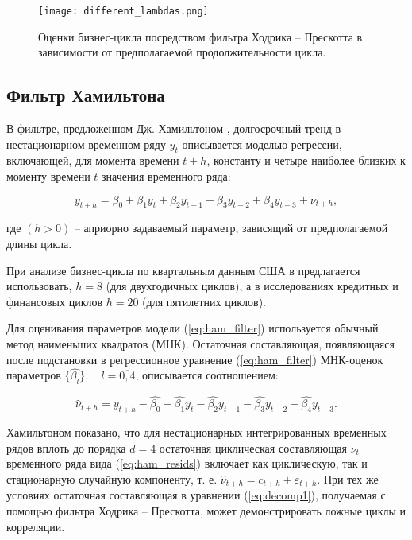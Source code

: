 \documentclass[a4paper,14pt]{extreport}
\begin{document}
	\begin{figure}
		\texttt{[image: different\_lambdas.png]}
		\caption{Оценки бизнес-цикла посредством фильтра Ходрика -- Прескотта в зависимости от предполагаемой продолжительности цикла.}
		\label{fig:different_lambda}
	\end{figure} 	
	
	\subsection{Фильтр Хамильтона}
	
	В фильтре, предложенном Дж. Хамильтоном \cite{hamHP}, долгосрочный тренд в нестационарном временном ряду $y_t$ описывается моделью регрессии, включающей, для момента времени $t+h$, константу и четыре наиболее близких к моменту времени $t$ значения временного ряда: 
	
	\begin{equation}
		y_{t+h} = \beta_0 + \beta_1 y_t + \beta_2 y_{t-1} 
		+ \beta_3 y_{t-2} + \beta_4 y_{t-3} + \nu_{t+h} ,
		\label{eq:ham_filter}
	\end{equation}
	
	где $(h>0)$ -- априорно задаваемый параметр, зависящий от предполагаемой длины цикла. 
	
	При анализе бизнес-цикла по квартальным данным США в \cite{hamHP} предлагается использовать, $h=8$ (для двухгодичных циклов), а в исследованиях кредитных и финансовых циклов $h=20$ (для пятилетних циклов).
	
	Для оценивания параметров модели (\ref{eq:ham_filter}) используется обычный метод наименьших квадратов (МНК). Остаточная составляющая, появляющаяся после подстановки в регрессионное уравнение (\ref{eq:ham_filter}) МНК-оценок параметров $\{\hat{\beta_l}\}, \quad l=\overline{0,4}$, описывается соотношением:
	
	\begin{equation}
		\hat{\nu}_{t+h} = y_{t+h} - \hat{\beta_0} - \hat{\beta_1} y_t 
		- \hat{\beta_2} y_{t-1} - \hat{\beta_3} y_{t-2} - \hat{\beta_4} y_{t-3} .
		\label{eq:ham_resids}
	\end{equation}	
	
	Хамильтоном показано, что для нестационарных интегрированных временных рядов вплоть до порядка $d=4$ остаточная циклическая составляющая $\nu_t$ временного ряда вида (\ref{eq:ham_resids}) включает как циклическую, так и стационарную случайную компоненту, т. е. $\hat{\nu}_{t+h}=c_{t+h} + \varepsilon_{t+h}$. При тех же условиях остаточная составляющая в уравнении (\ref{eq:decomp1}), получаемая с помощью фильтра Ходрика -- Прескотта, может демонстрировать ложные циклы и корреляции. 
	
\end{document}
